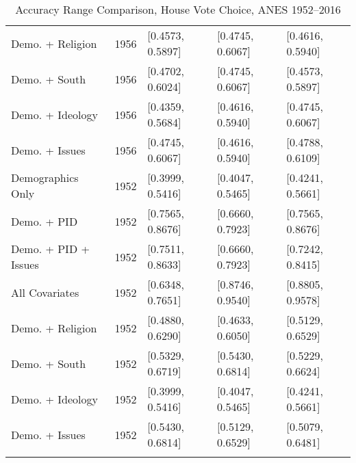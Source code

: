 \begin{longtable}{lrlll}
  Demo. + Religion & 1956 & [0.4573, 0.5897] & [0.4745, 0.6067] & [0.4616, 0.5940] \\ 
  Demo. + South & 1956 & [0.4702, 0.6024] & [0.4745, 0.6067] & [0.4573, 0.5897] \\ 
  Demo. + Ideology & 1956 & [0.4359, 0.5684] & [0.4616, 0.5940] & [0.4745, 0.6067] \\ 
  Demo. + Issues & 1956 & [0.4745, 0.6067] & [0.4616, 0.5940] & [0.4788, 0.6109] \\ 
  Demographics Only & 1952 & [0.3999, 0.5416] & [0.4047, 0.5465] & [0.4241, 0.5661] \\ 
  Demo. + PID & 1952 & [0.7565, 0.8676] & [0.6660, 0.7923] & [0.7565, 0.8676] \\ 
  Demo. + PID + Issues & 1952 & [0.7511, 0.8633] & [0.6660, 0.7923] & [0.7242, 0.8415] \\ 
  All Covariates & 1952 & [0.6348, 0.7651] & [0.8746, 0.9540] & [0.8805, 0.9578] \\ 
  Demo. + Religion & 1952 & [0.4880, 0.6290] & [0.4633, 0.6050] & [0.5129, 0.6529] \\ 
  Demo. + South & 1952 & [0.5329, 0.6719] & [0.5430, 0.6814] & [0.5229, 0.6624] \\ 
  Demo. + Ideology & 1952 & [0.3999, 0.5416] & [0.4047, 0.5465] & [0.4241, 0.5661] \\ 
  Demo. + Issues & 1952 & [0.5430, 0.6814] & [0.5129, 0.6529] & [0.5079, 0.6481] \\ 
   \bottomrule
\caption{Accuracy Range Comparison, House Vote Choice, ANES 1952--2016} 
\label{tab:ANES_house_accuracy}
\end{longtable}
